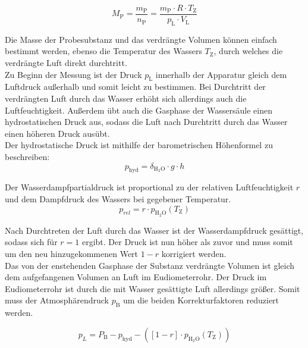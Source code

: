 \documentclass[12pt,a4paper,titlepage,headinclude,bibtotoc]{scrartcl}
\begin{document}
\begin{equation}
M_\mathrm{P} = \frac{m_\mathrm{P}}{n_\mathrm{P}} =\frac{m_\mathrm{P} \cdot R \cdot T_\mathrm{Z}}{p_\mathrm{L} \cdot V_\mathrm{L}}
\end{equation}

Die Masse der Probesubstanz und das verdrängte Volumen können einfach bestimmt werden, ebenso die Temperatur des Wassers $T_\mathrm{Z}$, durch welches die verdrängte Luft direkt durchtritt. \\
Zu Beginn der Messung ist der Druck $p_\mathrm{L}$ innerhalb der Apparatur gleich dem Luftdruck außerhalb und somit leicht zu bestimmen. Bei Durchtritt der verdrängten Luft durch das Wasser erhöht sich allerdings auch die Luftfeuchtigkeit. Außerdem übt auch die Gasphase der Wassersäule einen hydrostatischen Druck aus, sodass die Luft nach Durchtritt durch das Wasser einen höheren Druck ausübt. \\
Der hydrostatische Druck ist mithilfe der barometrischen Höhenformel zu beschreiben:\\

\begin{equation}
p_\mathrm{hyd}= \delta_\mathrm{H_2O} \cdot g \cdot h
\end{equation}

Der Wasserdampfpartialdruck ist proportional zu der relativen Luftfeuchtigkeit $r$ und dem Dampfdruck des Wassers bei gegebener Temperatur. \\

\begin{equation}
p_{rel} = r\cdot p_\mathrm{H_2O}(T_\mathrm{Z})
\end{equation}

Nach Durchtreten der Luft durch das Wasser ist der Wasserdampfdruck gesättigt, sodass sich für $r = 1$ ergibt. Der Druck ist nun höher als zuvor und muss somit um den neu hinzugekommenen Wert $1- r$ korrigiert werden. \\
Das von der enstehenden Gasphase der Substanz verdrängte Volumen ist gleich dem aufgefangenen Volumen an Luft im Eudiometerrohr. Der Druck im Eudiometerrohr ist durch die mit Wasser gesättigte Luft allerdings größer. Somit muss der Atmosphärendruck $p_\mathrm{B}$ um die beiden Korrekturfaktoren reduziert werden. 

\begin{equation}
p_L = P_\mathrm{B} - p_\mathrm{hyd} - ([1-r] \cdot p_\mathrm{H_2O}(T_\mathrm{Z}))
\end{equation}
\end{document}
